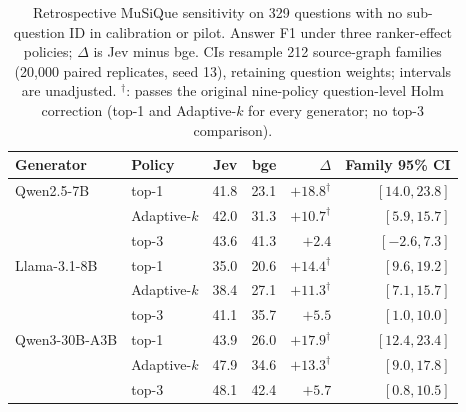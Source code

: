 \begin{table}[t]
\centering\footnotesize\setlength{\tabcolsep}{3pt}
\caption{Retrospective MuSiQue sensitivity on 329 questions with no sub-question ID in calibration or pilot. Answer F1 under three ranker-effect policies; $\Delta$ is Jev minus bge. CIs resample 212 source-graph families (20,000 paired replicates, seed 13), retaining question weights; intervals are unadjusted. $^\dagger$: passes the original nine-policy question-level Holm correction (top-1 and Adaptive-$k$ for every generator; no top-3 comparison).}
\label{tab:rag-clean}
\begin{tabular}{llrrrr}
\toprule
Generator & Policy & Jev & bge & $\Delta$ & Family 95\% CI \\
\midrule
Qwen2.5-7B & top-1 & 41.8 & 23.1 & $+18.8^\dagger$ & $[14.0, 23.8]$ \\
 & Adaptive-$k$ & 42.0 & 31.3 & $+10.7^\dagger$ & $[5.9, 15.7]$ \\
 & top-3 & 43.6 & 41.3 & $+2.4$ & $[-2.6, 7.3]$ \\
\addlinespace[2pt]
Llama-3.1-8B & top-1 & 35.0 & 20.6 & $+14.4^\dagger$ & $[9.6, 19.2]$ \\
 & Adaptive-$k$ & 38.4 & 27.1 & $+11.3^\dagger$ & $[7.1, 15.7]$ \\
 & top-3 & 41.1 & 35.7 & $+5.5$ & $[1.0, 10.0]$ \\
\addlinespace[2pt]
Qwen3-30B-A3B & top-1 & 43.9 & 26.0 & $+17.9^\dagger$ & $[12.4, 23.4]$ \\
 & Adaptive-$k$ & 47.9 & 34.6 & $+13.3^\dagger$ & $[9.0, 17.8]$ \\
 & top-3 & 48.1 & 42.4 & $+5.7$ & $[0.8, 10.5]$ \\
\bottomrule
\end{tabular}
\end{table}
